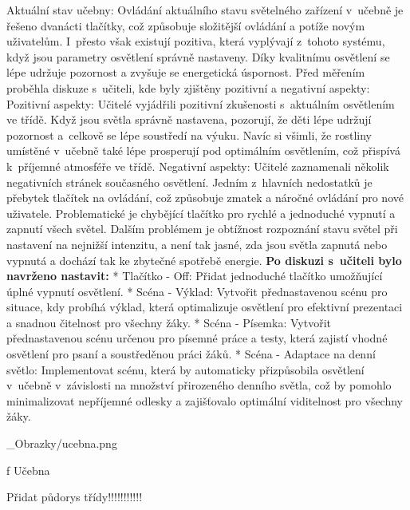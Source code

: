 \sec Aktuální stav učebny:
\medskip
Ovládání aktuálního stavu světelného zařízení v~učebně je řešeno dvanácti tlačítky, což způsobuje složitější ovládání
a potíže novým uživatelům. I~přesto však existují pozitiva, která vyplývají z~tohoto systému, když jsou parametry
osvětlení správně nastaveny. Díky kvalitnímu osvětlení se lépe udržuje pozornost a zvyšuje se energetická úspornost.
\medskip
Před měřením proběhla diskuze s~učiteli, kde byly zjištěny pozitivní a negativní aspekty:
\medskip
{\sbf Pozitivní aspekty:}
Učitelé vyjádřili pozitivní zkušenosti s~aktuálním osvětlením ve třídě. Když jsou světla správně nastavena,
pozorují, že děti lépe udržují pozornost a~celkově se lépe soustředí na výuku. Navíc si všimli, že rostliny
umístěné v~učebně také lépe prosperují pod optimálním osvětlením, což přispívá k~příjemné atmosféře ve třídě.
\medskip
{\sbf Negativní aspekty:}
Učitelé zaznamenali několik negativních stránek současného osvětlení. Jedním z~hlavních nedostatků je přebytek
tlačítek na ovládání, což způsobuje zmatek a náročné ovládání pro nové uživatele. Problematické je chybějící
tlačítko pro rychlé a jednoduché vypnutí a zapnutí všech světel. Dalším problémem je obtížnost rozpoznání
stavu světel při nastavení na nejnižší intenzitu, a není tak jasné, zda jsou světla zapnutá nebo vypnutá
a dochází tak ke zbytečné spotřebě energie.
\medskip
{\bf Po diskuzi s~učiteli bylo navrženo nastavit:}
\medskip
\begitems
    * {\sbf Tlačítko - Off:} Přidat jednoduché tlačítko umožňující úplné vypnutí osvětlení.
\medskip
    * {\sbf Scéna - Výklad:} Vytvořit přednastavenou scénu pro situace, kdy probíhá výklad, která optimalizuje
    osvětlení pro efektivní prezentaci a snadnou čitelnost pro všechny žáky.
\medskip
    * {\sbf Scéna - Písemka:} Vytvořit přednastavenou scénu určenou pro písemné práce a testy, která
    zajistí vhodné osvětlení pro psaní a soustředěnou práci žáků.
\medskip
    * {\sbf Scéna - Adaptace na denní světlo:} Implementovat scénu, která by automaticky přizpůsobila
    osvětlení v~učebně v~závislosti na množství přirozeného denního světla, což by pomohlo minimalizovat
    nepříjemné odlesky a zajišťovalo optimální viditelnost pro všechny žáky.
\enditems

\medskip {}
\picw=15cm _Obrazky/ucebna.png
\caption/f Učebna
\medskip

Přidat půdorys třídy!!!!!!!!!!!






